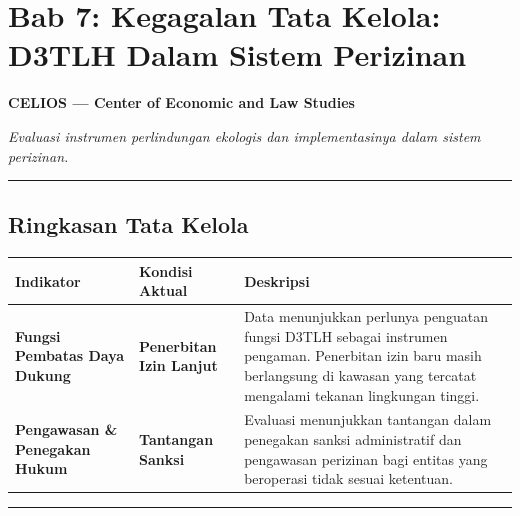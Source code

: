 \documentclass[
]{article}
\author{}
\date{}
\newcounter{none} %
\begin{document}
\section{Bab 7: Kegagalan Tata Kelola: D3TLH Dalam Sistem
Perizinan}\label{bab-7-kegagalan-tata-kelola-d3tlh-dalam-sistem-perizinan}

\textbf{CELIOS --- Center of Economic and Law Studies}

\emph{Evaluasi instrumen perlindungan ekologis dan implementasinya dalam
sistem perizinan.}

\begin{center}\rule{0.5\linewidth}{0.5pt}\end{center}

\subsection{Ringkasan Tata Kelola}\label{ringkasan-tata-kelola}

{\def\LTcaptype{none} %
\begin{longtable}[]{@{}
  >{\raggedright\arraybackslash}p{}
  >{\raggedright\arraybackslash}p{}
  >{\raggedright\arraybackslash}p{}@{}}
\toprule\noalign{}
\begin{minipage}[b]{\linewidth}\raggedright
Indikator
\end{minipage} & \begin{minipage}[b]{\linewidth}\raggedright
Kondisi Aktual
\end{minipage} & \begin{minipage}[b]{\linewidth}\raggedright
Deskripsi
\end{minipage} \\
\midrule\noalign{}
\endhead
\bottomrule\noalign{}
\endlastfoot
\textbf{Fungsi Pembatas Daya Dukung} & \textbf{Penerbitan Izin Lanjut} &
Data menunjukkan perlunya penguatan fungsi D3TLH sebagai instrumen
pengaman. Penerbitan izin baru masih berlangsung di kawasan yang
tercatat mengalami tekanan lingkungan tinggi. \\
\textbf{Pengawasan \& Penegakan Hukum} & \textbf{Tantangan Sanksi} &
Evaluasi menunjukkan tantangan dalam penegakan sanksi administratif dan
pengawasan perizinan bagi entitas yang beroperasi tidak sesuai
ketentuan. \\
\end{longtable}
}

\begin{center}\rule{0.5\linewidth}{0.5pt}\end{center}
\end{document}
